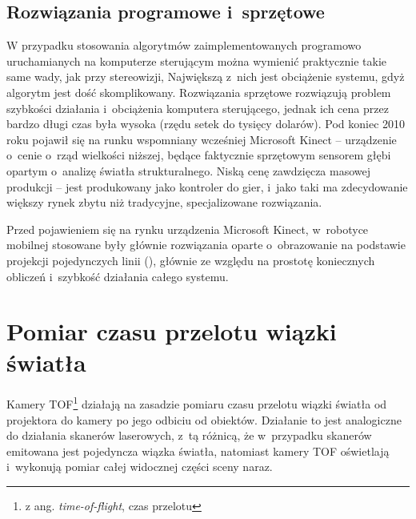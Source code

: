 \subsection{Rozwiązania programowe i~sprzętowe}

W przypadku stosowania algorytmów zaimplementowanych programowo uruchamianych na
komputerze sterującym można wymienić praktycznie takie same wady, jak przy
stereowizji, Największą z~nich jest obciążenie systemu, gdyż algorytm jest
dość skomplikowany. Rozwiązania sprzętowe rozwiązują problem szybkości działania
i~obciążenia komputera sterującego, jednak ich cena przez bardzo długi czas
była wysoka (rzędu setek do tysięcy dolarów). Pod koniec 2010 roku pojawił się
na runku wspomniany wcześniej Microsoft Kinect -- urządzenie o~cenie 
o~rząd wielkości niższej, będące faktycznie sprzętowym sensorem głębi opartym 
o~analizę światła strukturalnego. Niską cenę zawdzięcza masowej produkcji -- jest
produkowany jako kontroler do gier, i~jako taki ma zdecydowanie większy rynek
zbytu niż tradycyjne, specjalizowane rozwiązania.

Przed pojawieniem się na rynku urządzenia Microsoft Kinect, w~robotyce mobilnej
stosowane były głównie rozwiązania oparte o~obrazowanie na podstawie projekcji
pojedynczych linii (\cite{120445,5246792}), głównie ze względu na prostotę
koniecznych obliczeń i~szybkość działania całego systemu.


\section{Pomiar czasu przelotu wiązki światła}

Kamery TOF\footnote{z ang. {\it time-of-flight}, czas przelotu} działają na zasadzie
pomiaru czasu przelotu wiązki światła od projektora do kamery po jego odbiciu od
obiektów. Działanie to jest analogiczne do działania skanerów laserowych, z~tą różnicą,
że w~przypadku skanerów emitowana jest pojedyncza wiązka światła, natomiast kamery TOF
oświetlają i~wykonują pomiar całej widocznej części sceny naraz.

